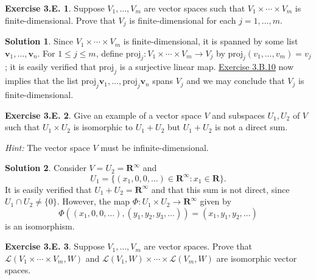 \documentclass[12pt]{article}
\theoremstyle{definition}
\theoremstyle{exercise}
\newtheorem{exercise}{Exercise 3.E.}
\theoremstyle{solution}
\newtheorem*{solution}{Solution}
\newcommand{\lmap}{\mathcal{L}}
\newcommand{\R}{\mathbf{R}}
\begin{document}
\begin{exercise}
\label{ex:2}
    Suppose \( V_1, \ldots, V_m \) are vector spaces such that \( V_1 \times \cdots \times V_m \) is finite-dimensional. Prove that \( V_j \) is finite-dimensional for each \( j = 1, \ldots, m \).
\end{exercise}

\begin{solution}
    Since \( V_1 \times \cdots \times V_m \) is finite-dimensional, it is spanned by some list \( \mathbf{v}_1, \ldots, \mathbf{v}_n \). For \( 1 \leq j \leq m \), define \( \text{proj}_j : V_1 \times \cdots \times V_m \to V_j \) by \( \text{proj}_j (v_1, \ldots, v_m) = v_j \); it is easily verified that \( \text{proj}_j \) is a surjective linear map. \href{https://lew98.github.io/Mathematics/LADR_Section_3_B_Exercises.pdf}{Exercise 3.B.10} now implies that the list \( \text{proj}_j \mathbf{v}_1, \ldots, \text{proj}_j \mathbf{v}_n \) spans \( V_j \) and we may conclude that \( V_j \) is finite-dimensional.
\end{solution}

\begin{exercise}
\label{ex:3}
    Give an example of a vector space \( V \) and subspaces \( U_1, U_2 \) of \( V \) such that \( U_1 \times U_2 \) is isomorphic to \( U_1 + U_2 \) but \( U_1 + U_2 \) is not a direct sum.

    \vspace{2mm}
    \noindent \textit{Hint:} The vector space \( V \) must be infinite-dimensional.
\end{exercise}

\begin{solution}
    Consider \( V = U_2 = \R^{\infty} \) and
    \[
        U_1 = \{ (x_1, 0, 0, \ldots) \in \R^{\infty} : x_1 \in \R \}.
    \]
    It is easily verified that \( U_1 + U_2 = \R^{\infty} \) and that this sum is not direct, since \( U_1 \cap U_2 \neq \{ 0 \} \). However, the map \( \Phi : U_1 \times U_2 \to \R^{\infty} \) given by
    \[
        \Phi((x_1, 0, 0, \ldots), (y_1, y_2, y_3, \ldots)) = (x_1, y_1, y_2, \ldots)
    \]
    is an isomorphism.
\end{solution}

\begin{exercise}
\label{ex:4}
    Suppose \( V_1, \ldots, V_m \) are vector spaces. Prove that \( \lmap(V_1 \times \cdots \times V_m, W) \) and \( \lmap(V_1, W) \times \cdots \times \lmap(V_m, W) \) are isomorphic vector spaces.
\end{exercise}
\end{document}
